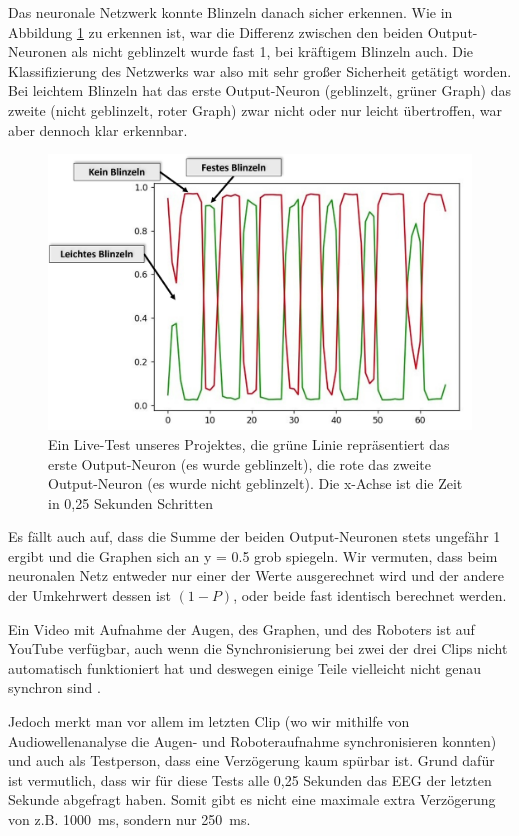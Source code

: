 \documentclass{scrartcl}
\begin{document}
	Das neuronale Netzwerk konnte Blinzeln danach sicher erkennen. Wie in Abbildung \ref{test-graph} zu erkennen ist, war die Differenz zwischen den beiden Output-Neuronen als nicht geblinzelt wurde fast 1, bei kräftigem Blinzeln auch. Die Klassifizierung des Netzwerks war also mit sehr großer Sicherheit getätigt worden. Bei leichtem Blinzeln hat das erste Output-Neuron (geblinzelt, grüner Graph) das zweite (nicht geblinzelt, roter Graph) zwar nicht oder nur leicht übertroffen, war aber dennoch klar erkennbar.

	\begin{figure}
		\includegraphics[width=\textwidth]{pictures/Test-Graph-annotated.png}
		\caption{Ein Live-Test unseres Projektes, die grüne Linie repräsentiert das erste Output-Neuron (es wurde geblinzelt), die rote das zweite Output-Neuron (es wurde nicht geblinzelt). Die x-Achse ist die Zeit in 0,25 Sekunden Schritten}
		\label{test-graph}
	\end{figure}

	Es fällt auch auf, dass die Summe der beiden Output-Neuronen stets ungefähr 1 ergibt und die Graphen sich an y = 0.5 grob spiegeln. Wir vermuten, dass beim neuronalen Netz entweder nur einer der Werte ausgerechnet wird und der andere der Umkehrwert dessen ist $\left(1 - P\right)$, oder beide fast identisch berechnet werden.
	
	Ein Video mit Aufnahme der Augen, des Graphen, und des Roboters ist auf YouTube verfügbar, auch wenn die Synchronisierung bei zwei der drei Clips nicht automatisch funktioniert hat und deswegen einige Teile vielleicht nicht genau synchron sind \cite{projekt-video}. 

	Jedoch merkt man vor allem im letzten Clip (wo wir mithilfe von Audiowellenanalyse die Augen- und Roboteraufnahme synchronisieren konnten) und auch als Testperson, dass eine Verzögerung kaum spürbar ist. Grund dafür ist vermutlich, dass wir für diese Tests alle 0,25 Sekunden das EEG der letzten Sekunde abgefragt haben. Somit gibt es nicht eine maximale extra Verzögerung von z.B. \qty{1000}{\milli\second}, sondern nur \qty{250}{\milli\second}.
\end{document}
